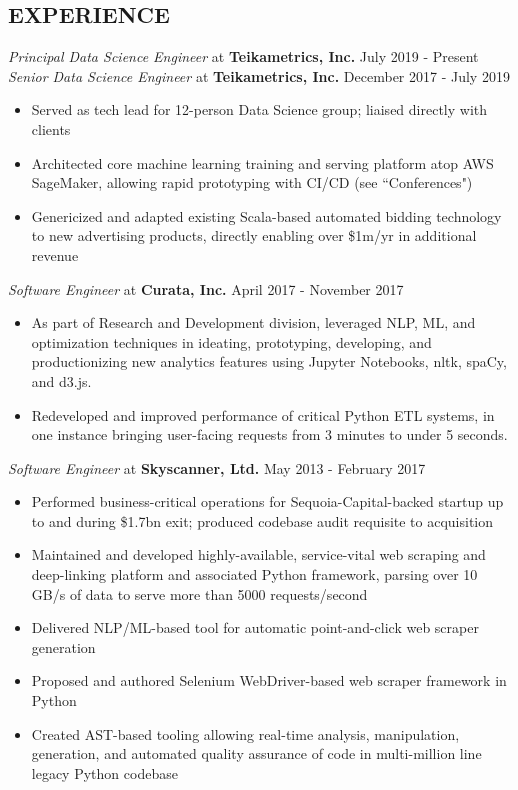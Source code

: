 \documentclass[line, margin]{res}
\begin{document}
\address{603 312 2553 | chase@chasestevens.com}

\begin{resume}
\section{EXPERIENCE}
\textit{Principal Data Science Engineer} at \textbf{Teikametrics, Inc.} \hfill July 2019 - Present \\
\textit{Senior Data Science Engineer} at \textbf{Teikametrics, Inc.} \hfill December 2017 - July 2019
\begin{itemize}[leftmargin=10pt]
\item Served as tech lead for 12-person Data Science group; liaised directly with clients
\item Architected core machine learning training and serving platform atop AWS SageMaker, allowing rapid prototyping with CI/CD (see ``Conferences")
\item Genericized and adapted existing Scala-based automated bidding technology to new advertising products, directly enabling over \$1m/yr in additional revenue
\end{itemize}
\textit{Software Engineer} at \textbf{Curata, Inc.} \hfill April 2017 - November 2017
\begin{itemize}[leftmargin=10pt]
\item As part of Research and Development division, leveraged NLP, ML, and optimization techniques in ideating, prototyping, developing, and productionizing new analytics features using Jupyter Notebooks, nltk, spaCy, and d3.js.
\item Redeveloped and improved performance of critical Python ETL systems, in one instance bringing user-facing requests from 3 minutes to under 5 seconds.
\end{itemize}
\textit{Software Engineer} at \textbf{Skyscanner, Ltd.} \hfill May 2013 - February 2017
\begin{itemize}[leftmargin=10pt]
\item Performed business-critical operations for Sequoia-Capital-backed startup up to and during \$1.7bn exit; produced codebase audit requisite to acquisition 
\item Maintained and developed highly-available, service-vital web scraping and deep-linking platform and associated Python framework, parsing over 10 GB/s of data to serve more than 5000 requests/second
\item Delivered NLP/ML-based tool for automatic point-and-click web scraper generation
\item Proposed and authored Selenium WebDriver-based web scraper framework in Python
\item Created AST-based tooling allowing real-time analysis, manipulation, generation, and automated quality assurance of code in multi-million line legacy Python codebase
\end{itemize}



\end{resume}
\end{document}
